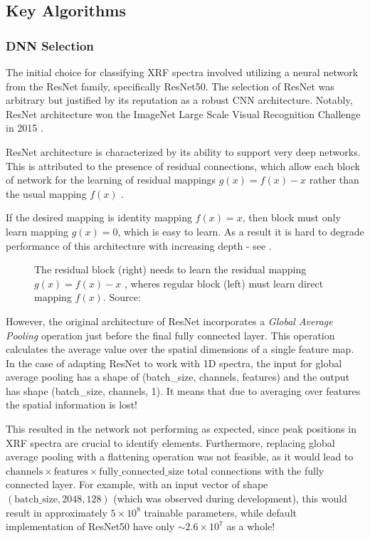 \subsection{Key Algorithms}
\subsubsection{DNN Selection}

The initial choice for classifying XRF spectra involved utilizing a neural network from the ResNet family, specifically ResNet50. The selection of ResNet was arbitrary but justified by its reputation as a robust CNN architecture. Notably, ResNet architecture won the ImageNet Large Scale Visual Recognition Challenge in 2015 \cite{ImageNet2015}.

ResNet architecture is characterized by its ability to support very deep networks. This is attributed to the presence of residual connections, which allow each block of network for the learning of residual mappings $g(x) = f(x) - x$ rather than the usual mapping $f(x)$ \cite{d2lResnet}. 

If the desired mapping is identity mapping $f(x) = x$, then block must only learn mapping $g(x) = 0$, which is easy to learn. 
As a result it is hard to degrade performance of this architecture with increasing depth - see .

\begin{figure}[h] 
  \centering     
   
  \caption{ The residual block (right) needs to learn the residual mapping $g(x) = f(x) - x$ , wheres regular block (left) must learn direct mapping $f(x)$. Source: \cite{d2lResnet}}
  \label{fig:residual-block}
\end{figure}

However, the original architecture of ResNet incorporates a \emph{Global Average Pooling} operation just before the final fully connected layer. 
This operation calculates the average value over the spatial dimensions of a single feature map. 
In the case of adapting ResNet to work with 1D spectra, the input for global average pooling has a shape of (batch\_size, channels, features) and the output has shape (batch\_size, channels, 1). 
It means that due to averaging over features the spatial information is lost!

This resulted in the network not performing as expected, since peak positions in XRF spectra are crucial to identify elements. 
Furthermore, replacing global average pooling with a flattening operation was not feasible, as it would lead to \\ $\text{{channels}} \times \text{{features}} \times \text{{fully\_connected\_size}}$ total connections with the fully connected layer. 
For example, with an input vector of shape $(\text{{batch\_size}}, 2048, 128)$ (which was observed during development), this would result in approximately $5 \times 10^{8}$ trainable parameters, while default implementation of ResNet50 have only $\sim2.6 \times 10^7$ as a whole!

